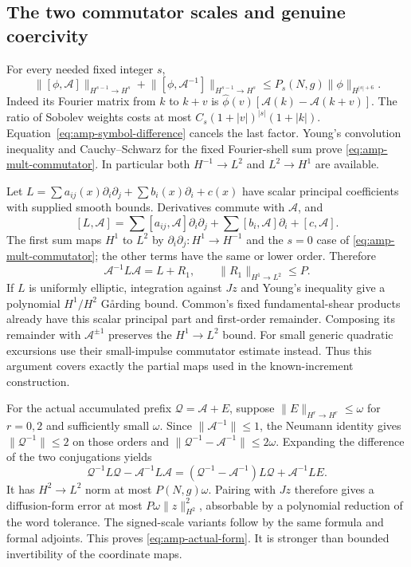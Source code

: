 \documentclass[11pt,a4paper]{amsart}
\theoremstyle{definition}
\theoremstyle{remark}
\numberwithin{equation}{section}
\newcommand{\norm}[1]{\lVert #1\rVert}
\begin{document}
\subsection{The two commutator scales and genuine coercivity}
For every needed fixed integer $s$,
\begin{equation}\label{eq:amp-mult-commutator}
 \norm{[\phi,\mathcal A]}_{H^{s-1}\to H^s}
 +\norm{[\phi,\mathcal A^{-1}]}_{H^{s-1}\to H^s}
 \le P_s(N,g)\norm\phi_{H^{|s|+6}} .
\end{equation}
Indeed its Fourier matrix from $k$ to $k+v$ is
$\widehat\phi(v)[\mathcal A(k)-\mathcal A(k+v)]$.
The ratio of Sobolev weights costs at most
$C_s(1+|v|)^{|s|}(1+|k|)$.
Equation~\eqref{eq:amp-symbol-difference} cancels the last factor.
Young's convolution inequality and
Cauchy--Schwarz for the fixed Fourier-shell sum prove
\eqref{eq:amp-mult-commutator}.  In particular both
$H^{-1}\to L^2$ and $L^2\to H^1$ are available.

Let $L=\sum a_{ij}(x)\partial_i\partial_j+\sum b_i(x)\partial_i+c(x)$
have scalar principal coefficients with supplied smooth bounds.
Derivatives commute with $\mathcal A$, and
\[
 [L,\mathcal A]=\sum[a_{ij},\mathcal A]\partial_i\partial_j
                    +\sum[b_i,\mathcal A]\partial_i+[c,\mathcal A].
 \]
The first sum maps $H^1$ to $L^2$ by
$\partial_i\partial_j:H^1\to H^{-1}$ and the $s=0$ case of
\eqref{eq:amp-mult-commutator}; the other terms have the same or
lower order.  Therefore
\begin{equation}\label{eq:amp-principal-conjugation}
 \mathcal A^{-1}L\mathcal A=L+R_1,\qquad
               \norm{R_1}_{H^1\to L^2}\le P .
\end{equation}
If $L$ is uniformly elliptic, integration against $Jz$ and Young's
inequality give a polynomial $H^1/H^2$ G\aa rding bound.
Common's fixed fundamental-shear products already have this scalar
principal part and first-order remainder.  Composing its remainder
with $\mathcal A^{\pm1}$ preserves the $H^1\to L^2$ bound.
For small generic quadratic excursions use their small-impulse
commutator estimate instead.  Thus this argument covers exactly the
partial maps used in the known-increment construction.

For the actual accumulated prefix $\mathcal Q=\mathcal A+E$, suppose
$\norm E_{H^r\to H^r}\le\omega$ for $r=0,2$ and sufficiently small
$\omega$.  Since $\norm{\mathcal A^{-1}}\le1$,
the Neumann identity gives $\norm{\mathcal Q^{-1}}\le2$ on those
orders and
$\norm{\mathcal Q^{-1}-\mathcal A^{-1}}\le2\omega$.
Expanding the difference of the two conjugations yields
\[
 \mathcal Q^{-1}L\mathcal Q-\mathcal A^{-1}L\mathcal A
 =(\mathcal Q^{-1}-\mathcal A^{-1})L\mathcal Q+
                                      \mathcal A^{-1}LE .
\]
It has $H^2\to L^2$ norm at most $P(N,g)\omega$.
Pairing with $Jz$ therefore gives a diffusion-form error at most
$P\omega\norm z_{H^2}^2$, absorbable by a polynomial reduction of
the word tolerance.  The signed-scale variants follow by the same
formula and formal adjoints.  This proves
\eqref{eq:amp-actual-form}.  It is stronger than bounded invertibility
of the coordinate maps.
\end{document}
